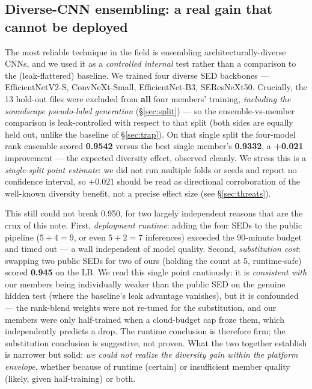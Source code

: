 \documentclass{ceurart}
\begin{document}
\subsection{Diverse-CNN ensembling: a real gain that cannot be deployed}
\label{sec:ensemble}

The most reliable technique in the field is ensembling architecturally-diverse
CNNs, and we used it as a \emph{controlled internal} test rather than a comparison
to the (leak-flattered) baseline. We trained four diverse SED backbones ---
EfficientNetV2-S, ConvNeXt-Small, EfficientNet-B3, SEResNeXt50. Crucially, the 13
hold-out files were excluded from \textbf{all} four members' training,
\emph{including the soundscape pseudo-label generation} (\S\ref{sec:split}) --- so
the ensemble-vs-member comparison is leak-controlled with respect to that split
(both sides are equally held out, unlike the baseline of \S\ref{sec:trap}). On that
single split the four-model rank ensemble scored \textbf{0.9542} versus the best
single member's \textbf{0.9332}, a \textbf{+0.021} improvement --- the expected
diversity effect, observed cleanly. We stress this is a \emph{single-split point
estimate}: we did not run multiple folds or seeds and report no confidence
interval, so $+0.021$ should be read as directional corroboration of the well-known
diversity benefit, not a precise effect size (see \S\ref{sec:threats}).

This still could not break 0.950, for two largely independent reasons that are the
crux of this note. First, \emph{deployment runtime}: adding the four SEDs to the
public pipeline ($5 + 4 = 9$, or even $5 + 2 = 7$ inferences) exceeded the
90-minute budget and timed out --- a wall independent of model quality. Second,
\emph{substitution cost}: swapping two public SEDs for two of ours (holding the
count at 5, runtime-safe) scored \textbf{0.945} on the LB. We read this single
point cautiously: it is \emph{consistent with} our members being individually
weaker than the public SED on the genuine hidden test (where the baseline's leak
advantage vanishes), but it is confounded --- the rank-blend weights were not
re-tuned for the substitution, and our members were only half-trained when a
cloud-budget cap froze them, which independently predicts a drop. The runtime
conclusion is therefore firm; the substitution conclusion is suggestive, not
proven. What the two together establish is narrower but solid: \emph{we could not
realize the diversity gain within the platform envelope}, whether because of
runtime (certain) or insufficient member quality (likely, given half-training) or
both.
\end{document}
